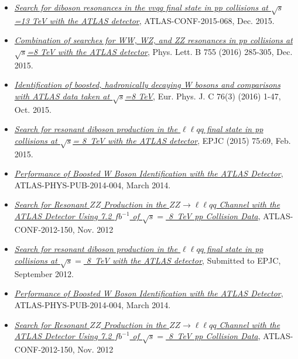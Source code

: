 \documentclass[10pt]{article}
\begin{document}
\begin{itemize}
\item \href{https://atlas.web.cern.ch/Atlas/GROUPS/PHYSICS/CONFNOTES/ATLAS-CONF-2015-068/}{\textit{Search for diboson resonances in the vvqq final state in pp collisions at $\sqrt{s}$=13 TeV with the ATLAS detector}}, ATLAS-CONF-2015-068, Dec. 2015.

\item \href{https://arxiv.org/abs/1512.05099}{\textit{Combination of searches for WW, WZ, and ZZ resonances in pp collisions at $\sqrt{s}$=8 TeV with the ATLAS detector}}, Phys. Lett. B 755 (2016) 285-305, Dec. 2015.

\item \href{https://arxiv.org/abs/1510.05821}{\textit{Identification of boosted, hadronically decaying W bosons and comparisons with ATLAS data taken at $\sqrt{s}$=8 TeV}}, Eur. Phys. J. C 76(3) (2016) 1-47, Oct. 2015.

\item \href{http://arxiv.org/abs/1409.6190}{\textit{Search for resonant diboson production in the $\ell\ell qq$ final state in pp collisions at $\sqrt{s}$= 8~TeV with the ATLAS detector}}, EPJC (2015) 75:69, Feb. 2015.

\item \href{http://atlas.web.cern.ch/Atlas/GROUPS/PHYSICS/PUBNOTES/ATL-PHYS-PUB-2014-004/}{\textit{Performance of Boosted W Boson Identification with the ATLAS Detector}}, ATLAS-PHYS-PUB-2014-004, March 2014.

\item \href{https://cds.cern.ch/record/1493489}{\textit{Search for Resonant $ZZ$ Production in the $ZZ\rightarrow \ell\ell qq$ Channel with the ATLAS Detector Using 7.2 $fb^{-1}$ of $\sqrt{s} =$ 8~TeV pp Collision Data}}, ATLAS-CONF-2012-150, Nov. 2012

\item \href{http://arxiv.org/abs/1409.6190}{\textit{Search for resonant diboson production in the $\ell\ell qq$ final state in pp collisions at $\sqrt{s} =$ 8~TeV with the ATLAS detector}}, Submitted to EPJC, September 2012.

\item \href{http://atlas.web.cern.ch/Atlas/GROUPS/PHYSICS/PUBNOTES/ATL-PHYS-PUB-2014-004/}{\textit{Performance of Boosted W Boson Identification with the ATLAS Detector}}, ATLAS-PHYS-PUB-2014-004, March 2014.

\item \href{https://cds.cern.ch/record/1493489}{\textit{Search for Resonant $ZZ$ Production in the $ZZ\rightarrow \ell\ell qq$ Channel with the ATLAS Detector Using 7.2 $fb^{-1}$ of $\sqrt{s} =$ 8~TeV pp Collision Data}}, ATLAS-CONF-2012-150, Nov. 2012


\end{itemize}
\end{document}
